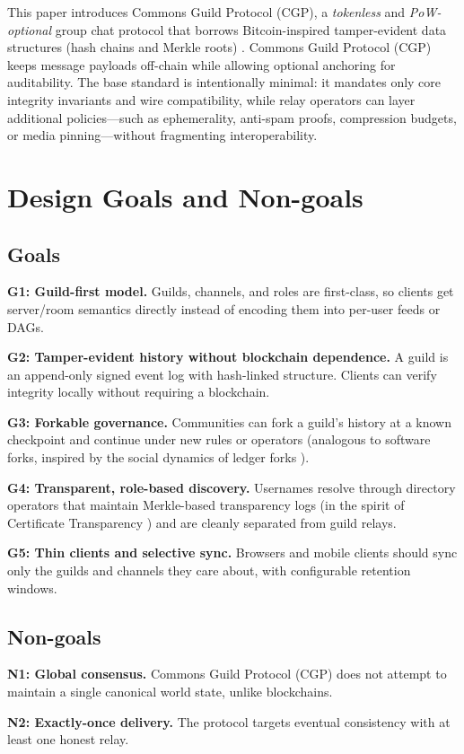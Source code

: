 \documentclass[conference]{IEEEtran}
\newcommand{\cgp}{Commons Guild Protocol (CGP)\xspace}
\begin{document}
This paper introduces \cgp, a \emph{tokenless} and \emph{PoW-optional} group chat protocol that borrows Bitcoin-inspired tamper-evident data structures (hash chains and Merkle roots) \cite{nakamoto2008bitcoin,merkle1987}. \cgp keeps message payloads off-chain while allowing optional anchoring for auditability. The base standard is intentionally minimal: it mandates only core integrity invariants and wire compatibility, while relay operators can layer additional policies---such as ephemerality, anti-spam proofs, compression budgets, or media pinning---without fragmenting interoperability.

\section{Design Goals and Non-goals}
\subsection{Goals}
\textbf{G1: Guild-first model.} Guilds, channels, and roles are first-class, so clients get server/room semantics directly instead of encoding them into per-user feeds or DAGs.

\textbf{G2: Tamper-evident history without blockchain dependence.} A guild is an append-only signed event log with hash-linked structure. Clients can verify integrity locally without requiring a blockchain.

\textbf{G3: Forkable governance.} Communities can fork a guild's history at a known checkpoint and continue under new rules or operators (analogous to software forks, inspired by the social dynamics of ledger forks \cite{nakamoto2008bitcoin}).

\textbf{G4: Transparent, role-based discovery.} Usernames resolve through directory operators that maintain Merkle-based transparency logs (in the spirit of Certificate Transparency \cite{rfc6962}) and are cleanly separated from guild relays.

\textbf{G5: Thin clients and selective sync.} Browsers and mobile clients should sync only the guilds and channels they care about, with configurable retention windows.

\subsection{Non-goals}
\textbf{N1: Global consensus.} \cgp does not attempt to maintain a single canonical world state, unlike blockchains.

\textbf{N2: Exactly-once delivery.} The protocol targets eventual consistency with at least one honest relay.
\end{document}
